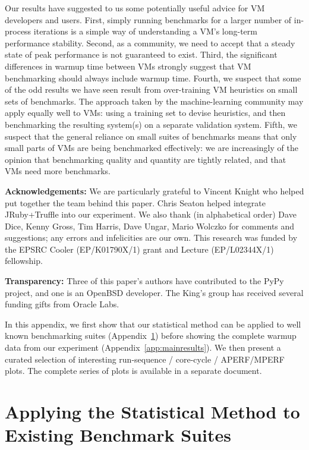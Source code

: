 \documentclass[preprint,numbers,10pt]{sigplanconf}
\begin{document}
Our results have suggested to us some potentially useful advice for VM
developers and users. First, simply running benchmarks for a larger number of
in-process iterations is a simple way of understanding a VM's long-term
performance stability. Second, as a community, we need to accept that a steady
state of peak performance is not guaranteed to exist. Third, the significant
differences in warmup time between VMs strongly suggest that VM benchmarking
should always include warmup time. Fourth, we suspect that some of the odd
results we have seen result from over-training VM heuristics on small sets of
benchmarks. The approach taken by the machine-learning community may apply
equally well to VMs: using a training set to devise heuristics, and then
benchmarking the resulting system(s) on a separate validation system. Fifth, we suspect
that the general reliance on small suites of benchmarks means that only
small parts of VMs are being benchmarked effectively: we are increasingly of the
opinion that benchmarking quality and quantity are tightly related, and that VMs
need more benchmarks.

\textbf{Acknowledgements:} We are particularly grateful to Vincent Knight
who helped put together the team behind this paper. Chris Seaton
helped integrate JRuby+Truffle into our experiment. We also thank (in alphabetical order) Dave Dice, Kenny
Gross, Tim Harris, Dave Ungar, Mario Wolczko for comments and suggestions; any
errors and infelicities are our own. This research was funded by the EPSRC
Cooler (EP/K01790X/1) grant and Lecture (EP/L02344X/1) fellowship.

\textbf{Transparency:} Three of this paper's authors have contributed
to the PyPy project, and one is an OpenBSD developer. The
King's group has received several funding gifts from Oracle Labs.




\clearpage

\appendix

\noindent In this appendix, we first show that our statistical method
can be applied to well known benchmarking suites (Appendix~\ref{sec:existing})
before showing the complete warmup data from our experiment
(Appendix~\ref{app:mainresults}). We
then present a curated selection of interesting run-sequence / core-cycle /
APERF/MPERF plots. The complete series of plots is available in a separate
document.


\section{Applying the Statistical Method to Existing Benchmark Suites}
\label{sec:existing}
\end{document}
